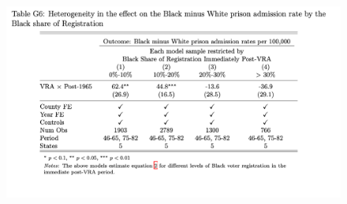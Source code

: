 \documentclass[12pt]{article}
\begin{document}
\clearpage \newpage
\begin{figure}[h!]
	\centering
	\includegraphics[width=6.0in]{../../60_appendix_cty_results/table_g6.png}
\end{figure}



\end{document}
